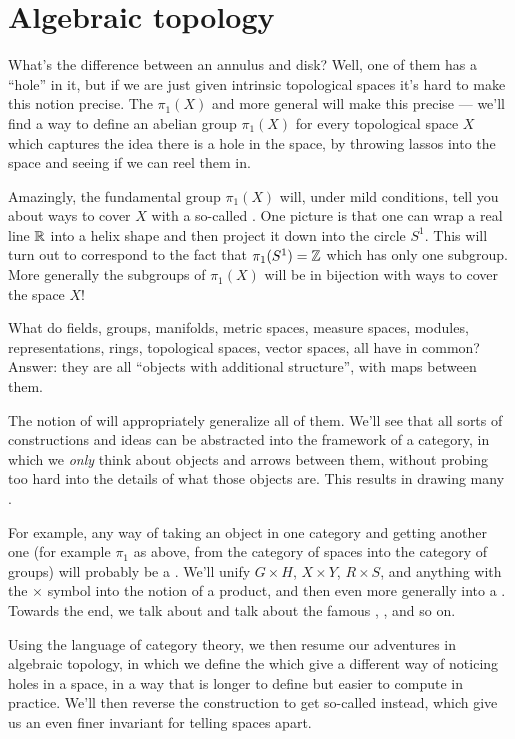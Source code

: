 \section{Algebraic topology}
\begin{itemize}
What's the difference between an annulus and disk?
Well, one of them has a ``hole'' in it,
but if we are just given intrinsic topological spaces
it's hard to make this notion precise.
The  $\pi_1(X)$
and more general 
will make this precise --- we'll find a way to define an abelian group
$\pi_1(X)$ for every topological space $X$ which captures the idea
there is a hole in the space, by throwing lassos into the space
and seeing if we can reel them in.

Amazingly, the fundamental group $\pi_1(X)$ will, under mild conditions,
tell you about ways to cover $X$ with a so-called
.
One picture is that one can wrap a real line $\mathbb R$ into a helix shape
and then project it down into the circle $S^1$.
This will turn out to correspond to the fact that $\pi_1(S^1) = \mathbb Z$
which has only one subgroup.
More generally the subgroups of $\pi_1(X)$ will be in
bijection with ways to cover the space $X$!

What do fields, groups, manifolds, metric spaces, measure spaces,
modules, representations, rings, topological spaces, vector spaces,
all have in common?
Answer: they are all ``objects with additional structure'',
with maps between them.

The notion of  will appropriately generalize all of them.
We'll see that all sorts of constructions and ideas
can be abstracted into the framework of a category,
in which we \emph{only} think about objects and arrows between them,
without probing too hard into the details of what those objects are.
This results in drawing many .

For example, any way of taking an object in one category
and getting another one (for example $\pi_1$ as above,
from the category of spaces into the category of groups)
will probably be a .
We'll unify $G \times H$, $X \times Y$, $R \times S$,
and anything with the $\times$ symbol into the notion of a product,
and then even more generally into a .
Towards the end, we talk about 
and talk about the famous
, , and so on.

Using the language of category theory,
we then resume our adventures in algebraic topology,
in which we define the 
which give a different way of noticing holes in a space,
in a way that is longer to define but easier to compute in practice.
We'll then reverse the construction to get so-called
 instead,
which give us an even finer invariant for telling spaces apart.
\end{itemize}


